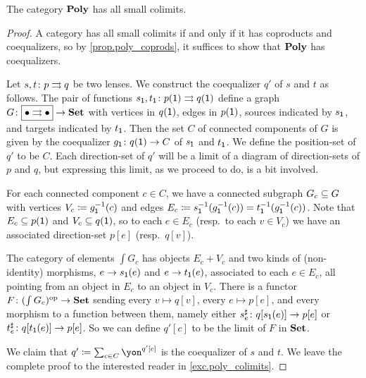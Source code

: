 \documentclass[Book-Poly]{subfiles}
\begin{document}
\begin{theorem}\label{thm.poly_colimits}
The category $\poly$ has all small colimits.
\end{theorem}
\begin{proof}
A category has all small colimits if and only if it has coproducts and coequalizers, so by \cref{prop.poly_coprods}, it suffices to show that $\poly$ has coequalizers.

Let $s,t \colon p \tto q$ be two lenses.
We construct the coequalizer $q'$ of $s$ and $t$ as follows.
The pair of functions $s_\1, t_\1 \colon p(\1) \tto q(\1)$ define a graph $G \colon \fbox{$\bullet\tto\bullet$} \to \smset$ with vertices in $q(\1)$, edges in $p(\1)$, sources indicated by $s_\1$, and targets indicated by $t_\1$.
Then the set $C$ of connected components of $G$ is given by the coequalizer $g_\1 \colon q(\1) \to C$ of $s_\1$ and $t_\1$.
We define the position-set of $q'$ to be $C$.
Each direction-set of $q'$ will be a limit of a diagram of direction-sets of $p$ and $q$, but expressing this limit, as we proceed to do, is a bit involved.

For each connected component $c \in C$, we have a connected subgraph $G_c \ss G$ with vertices $V_c \coloneqq g_\1\inv(c)$ and edges $E_c \coloneqq s_\1\inv(g_\1\inv(c)) = t_\1\inv(g_\1\inv(c))$.
Note that $E_c\ss p(\1)$ and $V_c\ss q(\1)$, so to each $e\in E_c$ (resp.\ to each $v\in V_c$) we have an associated direction-set $p[e]$ (resp.\ $q[v]$).

The category of elements $\int G_c$ has objects $E_c+V_c$ and two kinds of (non-identity) morphisms, $e \to s_\1(e)$ and $e \to t_\1(e)$, associated to each $e \in E_c$, all pointing from an object in $E_c$ to an object in $V_c$.
There is a functor $F \colon (\int G_c)\op \to \smset$ sending every $v \mapsto q[v]$, every $e \mapsto p[e]$, and every morphism to a function between them, namely either $s^\sharp_e \colon q[s_\1(e)] \to p[e]$ or $t^\sharp_e \colon q[t_\1(e)] \to p[e]$.
So we can define $q'[c]$ to be the limit of $F$ in $\smset$.

We claim that $q'\coloneqq\sum_{c\in C}\yon^{q'[c]}$ is the coequalizer of $s$ and $t$. We leave the complete proof to the interested reader in \cref{exc.poly_colimits}.
\end{proof}
\end{document}

